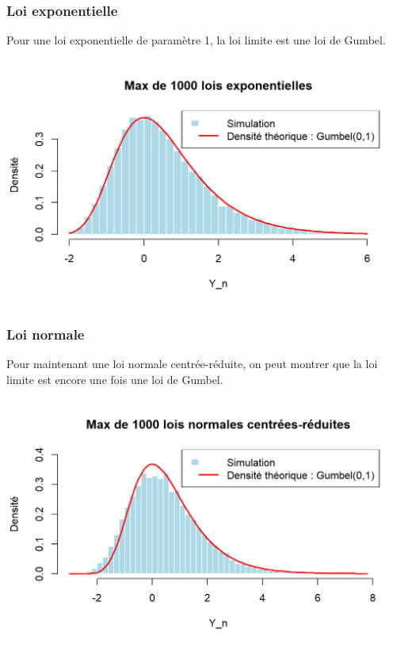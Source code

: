 \documentclass{article}
\begin{document}
\subsubsection{Loi exponentielle}
\noindent Pour une loi exponentielle de paramètre 1, la loi limite est une loi de Gumbel. 

\begin{center}
	\includegraphics[scale=0.8]{./Codes_R/Max_Expo.png} 
\end{center}


\subsubsection{Loi normale}

\noindent Pour maintenant une loi normale centrée-réduite, on peut montrer que la loi limite est encore une fois une loi de Gumbel.

\begin{center}
	\includegraphics[scale=0.8]{./Codes_R/Max_Normale.png} 
\end{center}
\end{document}
